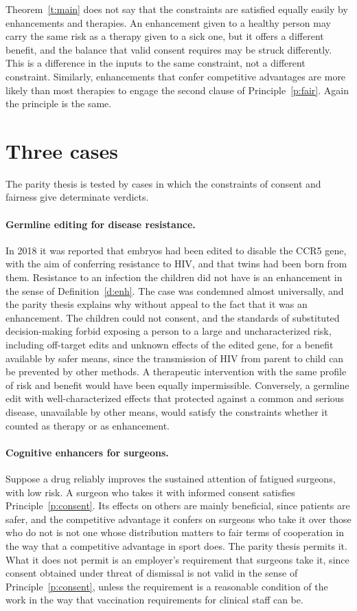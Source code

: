 \documentclass{situationist-preprint}
\begin{document}
Theorem~\ref{t:main} does not say that the constraints are satisfied equally easily by enhancements and therapies. An enhancement given to a healthy person may carry the same risk as a therapy given to a sick one, but it offers a different benefit, and the balance that valid consent requires may be struck differently. This is a difference in the inputs to the same constraint, not a different constraint. Similarly, enhancements that confer competitive advantages are more likely than most therapies to engage the second clause of Principle~\ref{p:fair}. Again the principle is the same.

\section{Three cases}

The parity thesis is tested by cases in which the constraints of consent and fairness give determinate verdicts.

\paragraph{Germline editing for disease resistance.} In 2018 it was reported that embryos had been edited to disable the CCR5 gene, with the aim of conferring resistance to HIV, and that twins had been born from them. Resistance to an infection the children did not have is an enhancement in the sense of Definition~\ref{d:enh}. The case was condemned almost universally, and the parity thesis explains why without appeal to the fact that it was an enhancement. The children could not consent, and the standards of substituted decision-making forbid exposing a person to a large and uncharacterized risk, including off-target edits and unknown effects of the edited gene, for a benefit available by safer means, since the transmission of HIV from parent to child can be prevented by other methods. A therapeutic intervention with the same profile of risk and benefit would have been equally impermissible. Conversely, a germline edit with well-characterized effects that protected against a common and serious disease, unavailable by other means, would satisfy the constraints whether it counted as therapy or as enhancement.

\paragraph{Cognitive enhancers for surgeons.} Suppose a drug reliably improves the sustained attention of fatigued surgeons, with low risk. A surgeon who takes it with informed consent satisfies Principle~\ref{p:consent}. Its effects on others are mainly beneficial, since patients are safer, and the competitive advantage it confers on surgeons who take it over those who do not is not one whose distribution matters to fair terms of cooperation in the way that a competitive advantage in sport does. The parity thesis permits it. What it does not permit is an employer's requirement that surgeons take it, since consent obtained under threat of dismissal is not valid in the sense of Principle~\ref{p:consent}, unless the requirement is a reasonable condition of the work in the way that vaccination requirements for clinical staff can be.
\end{document}
